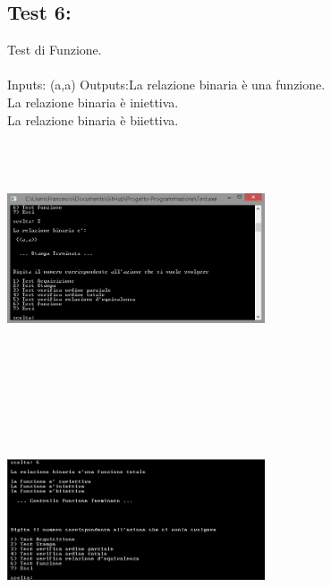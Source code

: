 \documentclass[11pt, a4paper, titlepage, block]{article}
\begin{document}
	\subsection{Test 6:}
	Test di Funzione.\\
	\\
	Inputs: (a,a) 
	Outputs:La relazione binaria \`e una funzione.\\
	La relazione binaria \`e iniettiva.\\
	La relazione binaria \`e biiettiva.\\
	\includegraphics[width=3in,height=3in,viewport=0 0 300 300]{../Screenshots/Test6Input.png}
	\\
	\includegraphics[width=3in,height=3in,viewport=0 0 300 300]{../Screenshots/Test6Output.png}
	\\
	\\
	\newpage
\end{document}
